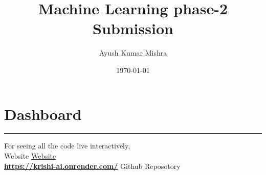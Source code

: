 \documentclass{article}
\title{\textcolor{primaryColor}{\Huge\textbf{Machine Learning phase-2 Submission}}}
\author{\textcolor{secondaryColor}{\Large Ayush Kumar Mishra}}
\date{\textcolor{secondaryColor}{\today}}
\begin{document}
\maketitle

\newpage
\section*{Dashboard}
  \begin{center}
        \color{red}\rule{1\linewidth}{1mm}
    \end{center}
\begin{center}
\vspace{2in}
    {\Huge  For seeing all the code live interactively, \\
    \vspace{1.5in}
    Website  \href{https://krishi-ai.onrender.com/}{Website}}\\
    
    \vspace{0.7in}
   \textbf{ \href{https://krishi-ai.onrender.com/}{https://krishi-ai.onrender.com/}}
   \vspace{l.5in}
   Github Reposotory \href{https://github.com/Ayush-mishra-0-0/cs550/}\\

\end{center}

\newpage
\tableofcontents


\newpage
\end{document}
